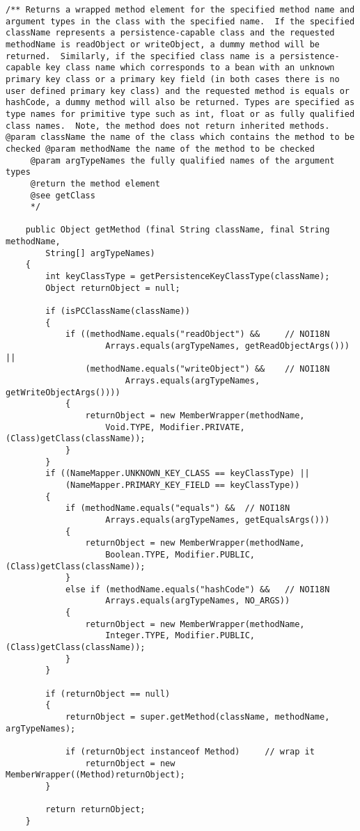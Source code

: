\begin{lstlisting}
/** Returns a wrapped method element for the specified method name and  argument types in the class with the specified name.  If the specified className represents a persistence-capable class and the requested methodName is readObject or writeObject, a dummy method will be returned.  Similarly, if the specified class name is a persistence-capable key class name which corresponds to a bean with an unknown primary key class or a primary key field (in both cases there is no user defined primary key class) and the requested method is equals or hashCode, a dummy method will also be returned. Types are specified as type names for primitive type such as int, float or as fully qualified class names.  Note, the method does not return inherited methods. @param className the name of the class which contains the method to be checked @param methodName the name of the method to be checked
	 @param argTypeNames the fully qualified names of the argument types
	 @return the method element
	 @see getClass
	 */
	 
	public Object getMethod (final String className, final String methodName,
		String[] argTypeNames)
	{
		int keyClassType = getPersistenceKeyClassType(className);
		Object returnObject = null;

		if (isPCClassName(className))
		{
			if ((methodName.equals("readObject") && 	// NOI18N
                    Arrays.equals(argTypeNames, getReadObjectArgs())) ||
				(methodName.equals("writeObject") && 	// NOI18N
                        Arrays.equals(argTypeNames, getWriteObjectArgs())))
			{
				returnObject = new MemberWrapper(methodName, 
					Void.TYPE, Modifier.PRIVATE, (Class)getClass(className));
			}
		}
		if ((NameMapper.UNKNOWN_KEY_CLASS == keyClassType) || 
			(NameMapper.PRIMARY_KEY_FIELD == keyClassType))
		{
			if (methodName.equals("equals") && 	// NOI18N
                    Arrays.equals(argTypeNames, getEqualsArgs()))
			{
				returnObject = new MemberWrapper(methodName, 
					Boolean.TYPE, Modifier.PUBLIC, (Class)getClass(className));
			}
			else if (methodName.equals("hashCode") && 	// NOI18N
                    Arrays.equals(argTypeNames, NO_ARGS))
			{
				returnObject = new MemberWrapper(methodName, 
					Integer.TYPE, Modifier.PUBLIC, (Class)getClass(className));
			}
		}

		if (returnObject == null)
		{
			returnObject = super.getMethod(className, methodName, argTypeNames);

			if (returnObject instanceof Method)		// wrap it
				returnObject = new MemberWrapper((Method)returnObject);
		}

		return returnObject;
	}	
\end{lstlisting}

